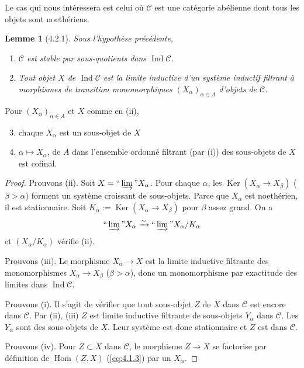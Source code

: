 \documentclass[12pt,a4paper]{article}
\theoremstyle{plain}
\newtheorem{lemma}[theorem]{Lemme}
\theoremstyle{definition}
\theoremstyle{remark}
\DeclareMathOperator{\Hom}{Hom}
\DeclareMathOperator{\Ker}{Ker}
\DeclareMathOperator{\Ind}{Ind}
\providecommand{\Hom}{\operatorname{Hom}}
\providecommand{\Ker}{\operatorname{Ker}}
\providecommand{\limind}{\varinjlim}
\begin{document}
Le cas qui nous int\'eressera est celui o\`u $\mathcal{C}$ est une cat\'egorie ab\'elienne
dont tous les objets sont noeth\'eriens.

\begin{lemma}[4.2.1]\label{lem:4.2.1}
Sous l'hypoth\`ese pr\'ec\'edente,
\begin{enumerate}[label=(\roman*)]
\item $\mathcal{C}$ est stable par sous-quotients dans $\Ind\mathcal{C}$.
\item Tout objet $X$ de $\Ind\mathcal{C}$ est la limite inductive d'un syst\`eme inductif
filtrant \`a morphismes de transition monomorphiques $(X_\alpha)_{\alpha \in A}$ d'objets de
$\mathcal{C}$.
\end{enumerate}
\end{lemma}

Pour $(X_\alpha)_{\alpha \in A}$ et $X$ comme en (ii),
\begin{enumerate}[label=(\roman*)]
\setcounter{enumi}{2}
\item chaque $X_\alpha$ est un sous-objet de $X$
\item $\alpha \mapsto X_\alpha$, de $A$ dans l'ensemble ordonn\'e filtrant (par (i)) des
sous-objets de $X$ est cofinal.
\end{enumerate}

\begin{proof}
Prouvons (ii). Soit $X = \text{``}\limind\text{''} X_\alpha$. Pour chaque $\alpha$, les
$\Ker(X_\alpha \to X_\beta)$ ($\beta > \alpha$) forment un syst\`eme croissant de
sous-objets. Parce que $X_\alpha$ est noeth\'erien, il est stationnaire. Soit
$K_\alpha := \Ker(X_\alpha \to X_\beta)$ pour $\beta$ assez grand. On a
\[
\text{``}\limind\text{''} X_\alpha \xrightarrow{\sim}
\text{``}\limind\text{''} X_\alpha/K_\alpha
\]
et $(X_\alpha/K_\alpha)$ v\'erifie (ii).

Prouvons (iii). Le morphisme $X_\alpha \to X$ est la limite inductive filtrante des
monomorphismes $X_\alpha \to X_\beta$ ($\beta > \alpha$), donc un monomorphisme par
exactitude des limites dans $\Ind\mathcal{C}$.

Prouvons (i). Il s'agit de v\'erifier que tout sous-objet $Z$ de $X$ dans $\mathcal{C}$
est encore dans $\mathcal{C}$. Par (ii), (iii) $Z$ est limite inductive filtrante de
sous-objets $Y_\alpha$ dans $\mathcal{C}$. Les $Y_\alpha$ sont des sous-objets de $X$. Leur
syst\`eme est donc stationnaire et $Z$ est dans $\mathcal{C}$.

Prouvons (iv). Pour $Z \subset X$ dans $\mathcal{C}$, le morphisme $Z \to X$ se
factorise par d\'efinition de $\Hom(Z,X)$ (\ref{eq:4.1.3}) par un $X_\alpha$.
\end{proof}
\end{document}
